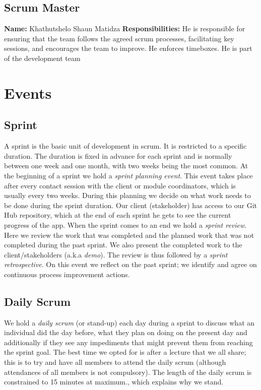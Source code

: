 \documentclass[hidelinks, 12pt, oneside]{article}
\begin{document}
	\subsection{Scrum Master}
 	\textbf{Name:} Khathutshelo Shaun Matidza\newline
	\textbf{Responsibilities:} He is responsible for ensuring that the team follows the agreed scrum processes, facilitating key sessions, and encourages 
	the team to improve. He enforces timeboxes. He is part of the development team\newpage
	
	\section{Events}
	\subsection{Sprint}
	A sprint is the basic unit of development in scrum. It is restricted to a specific duration. The duration is fixed in advance for each sprint and is 
	normally between one week and one month, with two weeks being the most common.\newline\newline
	At the beginning of a sprint we hold a \emph{sprint planning event}. This event takes place after every contact session with the client or module coordinators,
	which is usually every two weeks. During this planning we decide on what work needs to be done during the sprint duration. Our client (stakeholder) has access 
	to our Git Hub repository, which at the end of each sprint he gets to see the current progress of the app.\newline
	When the sprint comes to an end we hold a \emph{sprint review}. Here we review the work that was completed and the planned work that was not completed during the 
	past sprint. We also present the completed work to the client/stakeholders (a.k.a \emph{demo}).\newline
	The review is thus followed by a \emph{sprint retrospective}. On this event we reflect on the past sprint; we identify and agree on continuous process improvement actions. 
	\subsection{Daily Scrum}
 	We hold a \emph{daily scrum} (or stand-up) each day during a sprint to discuss what an individual did the day before, what they plan on doing on the present day and additionally if they 
 	see any impediments that might prevent them from reaching the sprint goal. The best time we opted for is after a lecture that we all share; this is to try and have 
 	all members	to attend the daily scrum (although attendances of all members is not compulsory). The length of the daily scrum is constrained to 15 minutes at maximum., which explains why we stand.\newpage 
 	
\end{document}
